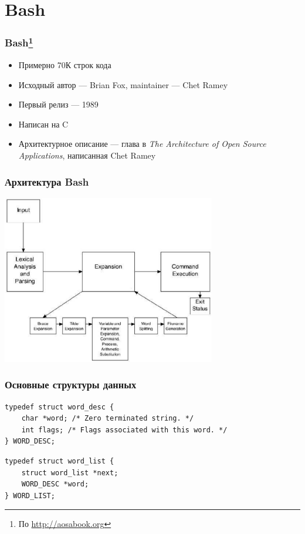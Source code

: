 \documentclass{../../slides-style}
\begin{document}
    \section{Bash}

    \begin{frame}
        \frametitle{Bash\footnote{\tiny{По \url{http://aosabook.org}}}}
        \begin{itemize}
            \item Примерно 70К строк кода
            \item Исходный автор --- Brian Fox, maintainer --- Chet Ramey
            \item Первый релиз --- 1989
            \item Написан на C
            \item Архитектурное описание --- глава в \textit{The Architecture of Open Source Applications}, написанная Chet Ramey
        \end{itemize}
    \end{frame}

    \begin{frame}
        \frametitle{Архитектура Bash}
        \begin{center}
            \includegraphics[width=0.7\textwidth]{bashArchitecture.png}
        \end{center}
    \end{frame}

    \begin{frame}[fragile]
        \frametitle{Основные структуры данных}
        \begin{verbatim}
typedef struct word_desc {
    char *word; /* Zero terminated string. */
    int flags; /* Flags associated with this word. */
} WORD_DESC;
        \end{verbatim}

        \vspace{3mm}

        \begin{verbatim}
typedef struct word_list {
    struct word_list *next;
    WORD_DESC *word;
} WORD_LIST;
        \end{verbatim}
    \end{frame}
\end{document}
